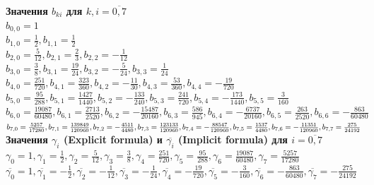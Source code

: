\documentclass[
11pt,
master, %
subf, %
href, %
colorlinks=true, %
times, %
]{disser}
\begin{document}
\textbf{Значения $b_{ki}$ для $k,i = \overline{0,7}$}\\
$b_{0, 0} = 1$\\
$b_{1, 0} = \frac{1}{2}      ,b_{1, 1} =  \frac{1}{2}    $\\
$b_{2, 0} = \frac{5}{12} ,b_{2, 1} =  \frac{2}{3}                 ,b_{2, 2} =  -\frac{1}{12}       $\\
$b_{3, 0} = \frac{3}{8} ,b_{3, 1} =  \frac{19}{24}                 ,b_{3, 2} =  -\frac{5}{24}                ,b_{3, 3} =  \frac{1}{24}    $\\
$b_{4, 0} = \frac{251}{720} ,b_{4, 1} =  \frac{323}{360}                 ,b_{4, 2} =  -\frac{11}{30}                ,b_{4, 3} =  \frac{53}{360}                 ,b_{4, 4} = -\frac{19}{720}            $\\
$b_{5, 0} = \frac{95}{288} ,b_{5, 1} =  \frac{1427}{1440}                 ,b_{5, 2} =  -\frac{133}{240}               ,b_{5, 3} =  \frac{241}{720}                ,b_{5, 4} =  -\frac{173}{1440}               ,b_{5, 5} =  \frac{3}{160}              $\\
$b_{6, 0} = \frac{19087}{60480}  ,b_{6, 1} =  \frac{2713}{2520}                  ,b_{6, 2} =  -\frac{15487}{20160}                ,b_{6, 3} =  \frac{586}{945}                 ,b_{6, 4} =  -\frac{6737}{20160}                ,b_{6, 5} =  \frac{263}{2520}                 ,b_{6, 6} =  -\frac{863}{60480}             $\\
$b_{7, 0} = \frac{5257}{17280} ,b_{7, 1} =  \frac{139849}{120960}                  ,b_{7, 2} =  -\frac{4511}{4480}                 ,b_{7, 3} =  \frac{123133}{120960}                 ,b_{7, 4} =  -\frac{88547}{120960}                ,b_{7, 5} =  \frac{1537}{4480}                 ,b_{7, 6} =  -\frac{11351}{120960}              ,\\
b_{7, 7} =  \frac{275}{24192}$\\

\textbf{Значения $\gamma_{i}$ (Explicit formula) и $\overline{\gamma_{i}}$ (Implicit formula) для $i = \overline{0,7}$}\\
$\gamma_0 = 1, \gamma_1  = \frac{1}{2}, \gamma_2  =  \frac{5}{12}, \gamma_3  =  \frac{3}{8} , \gamma_4  =  \frac{251}{720}, \gamma_5  = \frac{95}{288}, \gamma_6  = \frac{19087}{60480}, \gamma_7  =  \frac{5257}{17280} $\\
$\overline{\gamma_0} = 1, \overline{\gamma_1} =  -\frac{1}{2}, \overline{\gamma_2} =  -\frac{1}{12}, \overline{\gamma_3} = -\frac{1}{24}, \overline{\gamma_4} = -\frac{19}{720}, \overline{\gamma_5} = -\frac{3}{160}, \overline{\gamma_6} = -\frac{863}{60480}, \overline{\gamma_7} = -\frac{275}{24192}$
\end{document}
